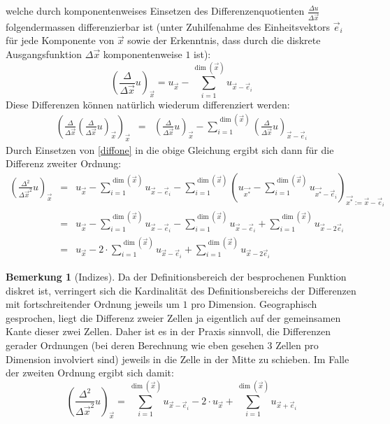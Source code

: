 \documentclass[11pt]{article} %
\theoremstyle{definition}
\newtheorem*{bemerkung}{Bemerkung}
\begin{document}
welche durch komponentenweises Einsetzen des Differenzenquotienten $\frac {\Delta u}{\Delta \vec x}$ folgendermassen differenzierbar ist (unter Zuhilfenahme des Einheitsvektors $\vec e_i$ für jede Komponente von $\vec x$ sowie der Erkenntnis, dass durch die diskrete Ausgangsfunktion $\Delta \vec{x}$ komponentenweise $1$ ist):
\begin{equation}\label{diffone}
	\left(\frac {\Delta}{\Delta \vec x} u\right)_{\vec x} = u_{\vec x} - \sum\limits_{i=1}^{\dim(\vec x)} u_{\vec x - \vec e_i}
\end{equation}
Diese Differenzen können natürlich wiederum differenziert werden:
\begin{eqnarray*}
	\left(\frac{\Delta}{\Delta \vec x}\left( \frac {\Delta}{\Delta \vec x} u \right)_{\vec x}\right)_{\vec x} &=& \left(\frac {\Delta}{\Delta \vec x} u\right)_{\vec x} - \sum\limits_{i=1}^{\dim(\vec x)} \left( \frac {\Delta}{\Delta \vec x} u \right)_{\vec x - \vec e_i}
\end{eqnarray*}
Durch Einsetzen von \ref{diffone} in die obige Gleichung ergibt sich dann für die Differenz zweiter Ordnung:
\begin{eqnarray*}
\left( \frac{\Delta^2}{\Delta \vec x^2} u\right)_{\vec x} &=& u_{\vec x} - \sum\limits_{i=1}^{\dim(\vec x)} u_{\vec x - \vec e_i} - 
\sum\limits_{i=1}^{\dim(\vec x)} \left( u_{\vec {x^*}} - \sum\limits_{i=1}^{\dim(\vec x)} u_{\vec {x^*} - \vec e_i} \right)_{\vec {x^*} := \vec x - \vec e_i} \\
&=& u_{\vec x} - \sum\limits_{i=1}^{\dim(\vec x)} u_{\vec x - \vec e_i} - \sum\limits_{i=1}^{\dim(\vec x)} u_{\vec x - \vec e_i} + \sum\limits_{i=1}^{\dim(\vec x)} u_{\vec x - 2\vec e_i} \\
&=&  u_{\vec x} - 2\cdot\sum\limits_{i=1}^{\dim(\vec x)} u_{\vec x - \vec e_i} + \sum\limits_{i=1}^{\dim(\vec x)} u_{\vec x - 2\vec e_i}
\end{eqnarray*}

\begin{bemerkung}[Indizes]
Da der Definitionsbereich der besprochenen Funktion diskret ist, verringert sich die Kardinalität des Definitionsbereichs der Differenzen mit fortschreitender Ordnung jeweils um $1$ pro Dimension. Geographisch gesprochen, liegt die Differenz zweier Zellen ja eigentlich auf der gemeinsamen Kante dieser zwei Zellen. Daher ist es in der Praxis sinnvoll, die Differenzen gerader Ordnungen (bei deren Berechnung wie eben gesehen 3 Zellen pro Dimension involviert sind) jeweils in die Zelle in der Mitte zu schieben. Im Falle der zweiten Ordnung ergibt sich damit:
\begin{equation}
\left( \frac{\Delta^2}{\Delta \vec x^2} u\right)_{\vec x} =\sum\limits_{i=1}^{\dim(\vec x)} u_{\vec x - \vec e_i}  -2\cdot u_{\vec x} + \sum\limits_{i=1}^{\dim(\vec x)} u_{\vec x + \vec e_i}
\end{equation}
\end{bemerkung}
\end{document}

